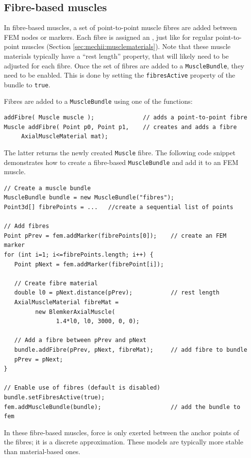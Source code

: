 \subsection{Fibre-based muscles}
\label{sec:fem:fibremuscle}

In fibre-based muscles, a set of point-to-point muscle fibres are added between
FEM nodes or markers.  Each fibre is assigned an 
, just like for 
regular point-to-point muscles (Section \ref{sec:mechii:musclematerials}).  Note
that these muscle materials typically have a ``rest length'' property, that will
likely need to be adjusted for each fibre.  Once the set of fibres are added
to a {\tt MuscleBundle}, they need to be enabled.  This is done by setting
the {\tt fibresActive} property of the bundle to {\tt true}.

Fibres are added to a {\tt MuscleBundle} using one of the functions:
\begin{lstlisting}[]
addFibre( Muscle muscle );              // adds a point-to-point fibre
Muscle addFibre( Point p0, Point p1,    // creates and adds a fibre
	 AxialMuscleMaterial mat);
\end{lstlisting}
The latter returns the newly created {\tt Muscle} fibre.  
The following code snippet demonstrates how to create a fibre-based 
{\tt MuscleBundle} and add it to an FEM muscle.
\lstset{numbers=left}
\begin{lstlisting}[]
// Create a muscle bundle
MuscleBundle bundle = new MuscleBundle("fibres");
Point3d[] fibrePoints = ...   //create a sequential list of points

// Add fibres
Point pPrev = fem.addMarker(fibrePoints[0]);    // create an FEM marker
for (int i=1; i<=fibrePoints.length; i++) {
   Point pNext = fem.addMarker(fibrePoint[i]);

   // Create fibre material
   double l0 = pNext.distance(pPrev);           // rest length
   AxialMuscleMaterial fibreMat = 
         new BlemkerAxialMuscle(
               1.4*l0, l0, 3000, 0, 0);

   // Add a fibre between pPrev and pNext
   bundle.addFibre(pPrev, pNext, fibreMat);     // add fibre to bundle
   pPrev = pNext;
}

// Enable use of fibres (default is disabled)
bundle.setFibresActive(true);
fem.addMuscleBundle(bundle);                    // add the bundle to fem
\end{lstlisting}
\lstset{numbers=none}

In these fibre-based muscles, force is only exerted between the anchor
points of the fibres; it is a discrete approximation.  These models
are typically more stable than material-based ones.

